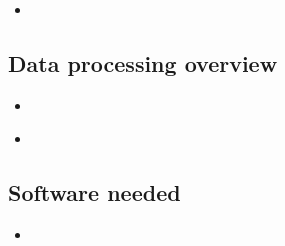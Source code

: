 \documentclass[compress, ucs, xelatex, 11pt, xcolor=x11names, aspectratio=1609,
	hyperref={
		bookmarks=true,
		unicode=true,
		colorlinks=true,
		pdftitle={HybSeq course},
		plainpages=false,
		pdfauthor={Vojtech Zeisek},
		pdfsubject={Practical processing of HybSeq target enrichment sequencing data on computing grids like MetaCentrum},
		pdfcreator={XeLaTeX},
		pdfkeywords={BASH, command line, GNU, HybSeq, Linux, MetaCentrum, sequencing shell, target enrichment},
		linkcolor=Cyan2, %
		anchorcolor=Firebrick2, %
		citecolor=Firebrick2, %
		filecolor=Firebrick2, %
		menucolor=Firebrick2, %
		urlcolor=Chartreuse2, %
		pdftex},
	url={hyphens, lowtilde} %
	]{beamer}
\begin{document}
\begin{frame}[fragile]{}
	\begin{itemize}
		\item 
	\end{itemize}
	\begin{spluscode}
    
	\end{spluscode}
	\begin{bashcode}
    
	\end{bashcode}
\end{frame}

\subsection{Data processing overview}

\begin{frame}[fragile]{}
	\begin{itemize}
		\item 
	\end{itemize}
	\begin{spluscode}
    
	\end{spluscode}
	\begin{bashcode}
    
	\end{bashcode}
\end{frame}

\begin{frame}[fragile]{}
	\begin{itemize}
		\item 
	\end{itemize}
	\begin{spluscode}
    
	\end{spluscode}
	\begin{bashcode}
    
	\end{bashcode}
\end{frame}

\subsection{Software needed}

\begin{frame}[fragile]{}
	\begin{itemize}
		\item 
	\end{itemize}
	\begin{spluscode}
    
	\end{spluscode}
	\begin{bashcode}
    
	\end{bashcode}
\end{frame}
\end{document}

